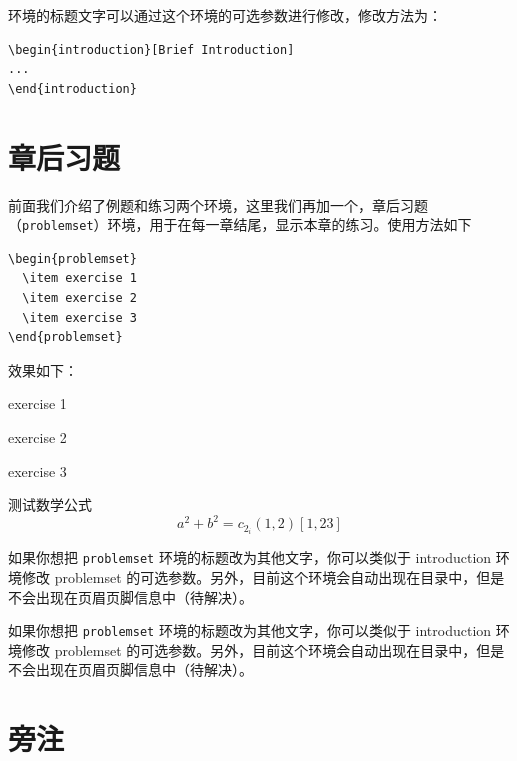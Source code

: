 \documentclass[lang=cn,newtx,10pt,scheme=chinese]{elegantbook}
\begin{document}
环境的标题文字可以通过这个环境的可选参数进行修改，修改方法为：
\begin{lstlisting}
\begin{introduction}[Brief Introduction]
...
\end{introduction}
\end{lstlisting}

\section{章后习题}
前面我们介绍了例题和练习两个环境，这里我们再加一个，章后习题（\lstinline{problemset}）环境，用于在每一章结尾，显示本章的练习。使用方法如下

\begin{lstlisting}
\begin{problemset}
  \item exercise 1
  \item exercise 2
  \item exercise 3
\end{problemset}
\end{lstlisting}


效果如下：
\begin{problemset}[我的题目]
  \item exercise 1
  \item exercise 2
  \item exercise 3
  \item 测试数学公式
  \begin{equation}
    a^2+b^2=c_{2_{i}} (1,2) [1,23]
  \end{equation}
\end{problemset}

\begin{remark}
如果你想把 \lstinline{problemset} 环境的标题改为其他文字，你可以类似于 introduction 环境修改 problemset 的可选参数。另外，目前这个环境会自动出现在目录中，但是不会出现在页眉页脚信息中（待解决）。
\end{remark}

\begin{solution}
如果你想把 \lstinline{problemset} 环境的标题改为其他文字，你可以类似于 introduction 环境修改 problemset 的可选参数。另外，目前这个环境会自动出现在目录中，但是不会出现在页眉页脚信息中（待解决）。
\end{solution}

\section{旁注}
\end{document}
